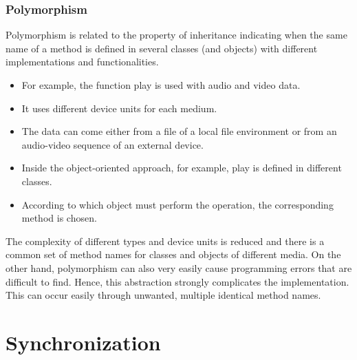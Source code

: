 

\subsubsection{Polymorphism}

\begin{multicols}{2}
Polymorphism is related to the property of inheritance indicating when the same name of a method is defined in several classes (and objects) with different implementations and functionalities. 
	\begin{itemize}
		\item For example, the function play is used with audio and video data. 
		\item It uses different device units for each medium. 
		\item The data can come either from a file of a local file environment or from an audio-video sequence of an external device. 
		\item Inside the object-oriented approach, for example, play is defined in different classes. 
		\item According to which object must perform the operation, the corresponding method is chosen.
\end{itemize}
\end{multicols}

The complexity of different types and device units is reduced and there is a common set of method names for classes and objects of different media.  On the other hand, polymorphism can also very easily cause programming errors that are difficult to find. Hence, this abstraction strongly complicates the implementation. This can occur easily
through unwanted, multiple identical method names.



\section{Synchronization}
